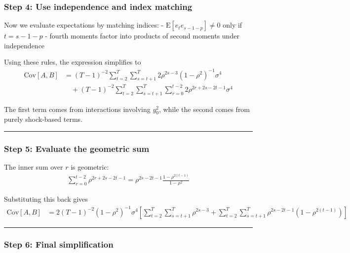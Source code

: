 \documentclass[11pt]{article}
\begin{document}
\subsubsection{Step 4: Use independence and index
matching}\label{step-4-use-independence-and-index-matching}

Now we evaluate expectations by matching indices: -
\(\text{E}[e_t e_{s-1-p}] \neq 0\) only if \(t = s-1-p\) - fourth
moments factor into products of second moments under independence

Using these rules, the expression simplifies to \[
\begin{aligned}
\text{Cov}[A,B]
&=
(T-1)^{-2}\sum_{t=2}^T\sum_{s=t+1}^T
2\rho^{2s-3}(1-\rho^2)^{-1}\sigma^4\\
&\quad+
(T-1)^{-2}\sum_{t=2}^T\sum_{s=t+1}^T\sum_{r=0}^{t-2}
2\rho^{2r+2s-2t-1}\sigma^4
\end{aligned}
\]

The first term comes from interactions involving \(y_0^2\), while the
second comes from purely shock-based terms.

\begin{center}\rule{0.5\linewidth}{0.5pt}\end{center}

\subsubsection{Step 5: Evaluate the geometric
sum}\label{step-5-evaluate-the-geometric-sum}

The inner sum over \(r\) is geometric: \[
\begin{aligned}
\sum_{r=0}^{t-2}\rho^{2r+2s-2t-1}
=
\rho^{2s-2t-1}\frac{1-\rho^{2(t-1)}}{1-\rho^2}
\end{aligned}
\]

Substituting this back gives \[
\begin{aligned}
\text{Cov}[A,B]
&=
2(T-1)^{-2}(1-\rho^2)^{-1}\sigma^4
\left[
\sum_{t=2}^T\sum_{s=t+1}^T\rho^{2s-3}
+
\sum_{t=2}^T\sum_{s=t+1}^T\rho^{2s-2t-1}(1-\rho^{2(t-1)})
\right]
\end{aligned}
\]

\begin{center}\rule{0.5\linewidth}{0.5pt}\end{center}

\subsubsection{Step 6: Final
simplification}\label{step-6-final-simplification}
\end{document}
